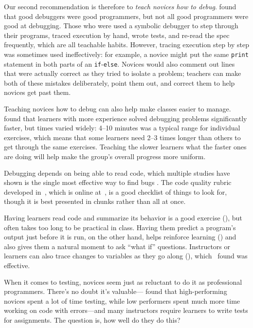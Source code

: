 Our second recommendation is therefore to \emph{teach novices how to debug}.
\cite{Fitz2008,Murp2008} found that good debuggers were good
programmers, but not all good programmers were good at debugging. Those
who were used a symbolic debugger to step through their programs, traced
execution by hand, wrote tests, and re-read the spec frequently, which
are all teachable habits. However, tracing execution step by step was
sometimes used ineffectively: for example, a novice might put the same
\texttt{print} statement in both parts of an \texttt{if}-\texttt{else}. Novices would also
comment out lines that were actually correct as they tried to isolate a
problem; teachers can make both of these mistakes deliberately, point
them out, and correct them to help novices get past them.

Teaching novices how to debug can also help make classes easier to
manage. \cite{Alqa2017} found that learners with more experience
solved debugging problems significantly faster, but times varied widely:
4--10 minutes was a typical range for individual exercises, which means
that some learners need 2--3 times longer than others to get through the
same exercises. Teaching the slower learners what the faster ones are
doing will help make the group's overall progress more uniform.

Debugging depends on being able to read code, which multiple studies
have shown is the single most effective way to find bugs
\cite{Basi1987,Keme2009,Bacc2013}. The code
quality rubric developed in~\cite{Steg2014,Steg2016a},
which is online at~\cite{Steg2016b}, is a good checklist of things
to look for, though it is best presented in chunks rather than all at
once.

Having learners read code and summarize its behavior is a good exercise
(), but often takes too long to be
practical in class. Having them predict a program's output just before
it is run, on the other hand, helps reinforce learning
() and also gives them a natural
moment to ask ``what if'' questions. Instructors or learners can also
trace changes to variables as they go along (),
which~\cite{Cunn2017} found was effective.


When it comes to testing, novices seem just as reluctant to do it as
professional programmers. There's no doubt it's
valuable---\cite{Cart2017} found that high-performing novices spent a
lot of time testing, while low performers spent much more time working
on code with errors---and many instructors require learners to write tests
for assignments. The question is, how well do they do this?

